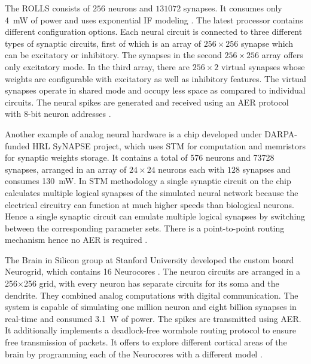 The \ac{ROLLS} consists of $256$ neurons and $131072$ synapses.
It consumes only \SI{4}{\milli\watt} of power and uses exponential \ac{IF} modeling \cite{Qiao2015}.
The latest processor contains different configuration options.
Each neural circuit is connected to three different types of synaptic circuits, first of which is an array of $256\times256$ synapse which can be excitatory or inhibitory.
The synapses in the second $256\times256$ array offers only excitatory mode.
In the third array, there are $256\times2$ virtual synapses whose weights are configurable with excitatory as well as inhibitory features. The virtual synapses operate in shared mode and occupy less space as compared to individual circuits.
The neural spikes are generated and received using an \ac{AER} protocol with \num{8}-bit neuron addresses \cite{Qiao2015}.

Another example of analog neural hardware is a chip \cite{Srinivasa2012} developed under \ac{DARPA}-funded \ac{HRL} \ac{SyNAPSE} project, which uses \ac{STM} for computation and memristors for synaptic weights storage.
It contains a total of 576 neurons and 73728 synapses, arranged in an array of $24\times24$ neurons each with $128$ synapses and consumes \SI{130}{\milli\watt}.
In \ac{STM} methodology a single synaptic circuit on the chip calculates multiple logical synapses of the simulated neural network because the electrical circuitry can function at much higher speeds than biological neurons.
Hence a single synaptic circuit can emulate multiple logical synapses by switching between the corresponding parameter sets.
There is a point-to-point routing mechanism hence no \ac{AER} is required \cite{Walter2015}. 

The Brain in Silicon group at Stanford University developed the custom board Neurogrid, which contains \num{16} Neurocores \cite{Benjamin2014, Choudhary2012}.
The neuron circuits are arranged in a 256$\times$256 grid, with every neuron has separate circuits for its soma and the dendrite.
They combined analog computations with digital communication.
The system is capable of simulating one million neuron and eight billion synapses in real-time and consumed \SI{3.1}{\watt} of power.
The spikes are transmitted using \ac{AER}.
It additionally implements a deadlock-free wormhole routing protocol to ensure free transmission of packets.
It offers to explore different cortical areas of the brain by programming each of the Neurocores with a different model \cite{Merolla2014}.

